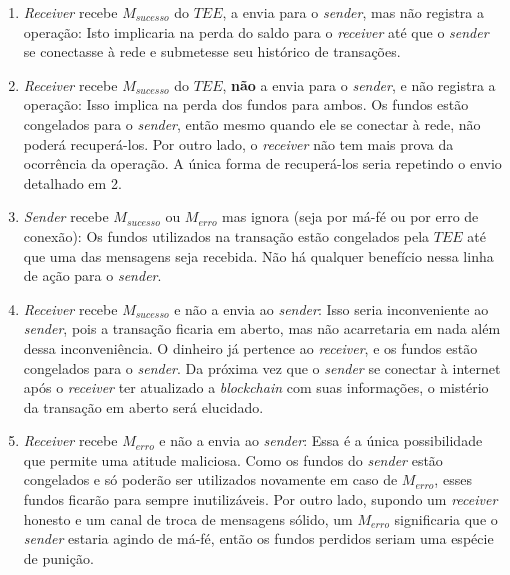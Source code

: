 \documentclass[
  12pt,
  a4paper,
  oneside,
  article,
]{abntex2}
\begin{document}
\begin{enumerate}
	\item \textit{Receiver} recebe $M_{sucesso}$ do $TEE$, a envia para o \textit{sender}, mas não registra a operação:
	      \subitem Isto implicaria na perda do saldo para o \textit{receiver} até que o \textit{sender} se conectasse à rede e submetesse seu histórico de transações.
	\item \textit{Receiver} recebe $M_{sucesso}$ do $TEE$, \textbf{não} a envia para o \textit{sender}, e não registra a operação:
	      \subitem Isso implica na perda dos fundos para ambos. Os fundos estão congelados para o \textit{sender}, então mesmo quando ele se conectar à rede, não poderá recuperá-los. Por outro lado, o \textit{receiver} não tem mais prova da ocorrência da operação. A única forma de recuperá-los seria repetindo o envio detalhado em 2.
	\item \textit{Sender} recebe $M_{sucesso}$ ou $M_{erro}$ mas ignora (seja por má-fé ou por erro de conexão):
	      \subitem Os fundos utilizados na transação estão congelados pela $TEE$ até que uma das mensagens seja recebida. Não há qualquer benefício nessa linha de ação para o \textit{sender}.

	\item \textit{Receiver} recebe $M_{sucesso}$ e não a envia ao \textit{sender}:
	      \subitem Isso seria inconveniente ao \textit{sender}, pois a transação ficaria em aberto, mas não acarretaria em nada além dessa inconveniência. O dinheiro já pertence ao \textit{receiver}, e os fundos estão congelados para o \textit{sender}. Da próxima vez que o \textit{sender} se conectar à internet após o \textit{receiver} ter atualizado a \textit{blockchain} com suas informações, o mistério da transação em aberto será elucidado.

	\item \textit{Receiver} recebe $M_{erro}$ e não a envia ao \textit{sender}:
	      \subitem Essa é a única possibilidade que permite uma atitude maliciosa. Como os fundos do \textit{sender} estão congelados e só poderão ser utilizados novamente em caso de $M_{erro}$, esses fundos ficarão para sempre inutilizáveis. Por outro lado, supondo um \textit{receiver} honesto e um canal de troca de mensagens sólido, um $M_{erro}$ significaria que o \textit{sender} estaria agindo de má-fé, então os fundos perdidos seriam uma espécie de punição.
\end{enumerate}

\end{document}
